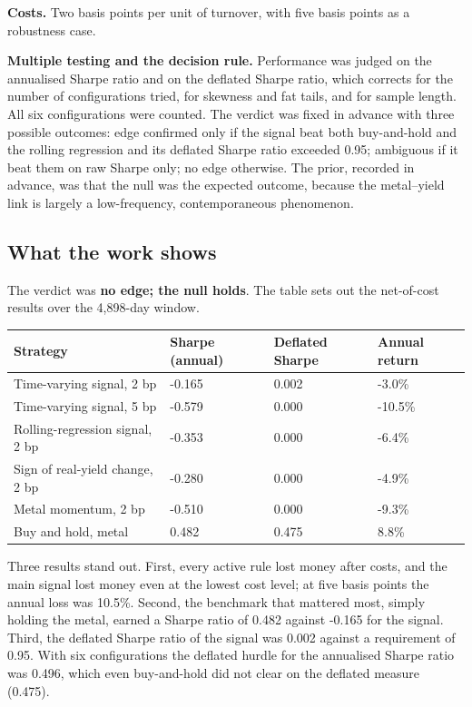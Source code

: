 \documentclass[
  british,
  a4paper,
]{article}
\newcounter{none} %
\begin{document}
\textbf{Costs.} Two basis points per unit of turnover, with five basis
points as a robustness case.

\textbf{Multiple testing and the decision rule.} Performance was judged
on the annualised Sharpe ratio and on the deflated Sharpe ratio, which
corrects for the number of configurations tried, for skewness and fat
tails, and for sample length. All six configurations were counted. The
verdict was fixed in advance with three possible outcomes: edge
confirmed only if the signal beat both buy-and-hold and the rolling
regression and its deflated Sharpe ratio exceeded 0.95; ambiguous if it
beat them on raw Sharpe only; no edge otherwise. The prior, recorded in
advance, was that the null was the expected outcome, because the
metal--yield link is largely a low-frequency, contemporaneous
phenomenon.

\subsection{What the work shows}\label{what-the-work-shows}

The verdict was \textbf{no edge; the null holds}. The table sets out the
net-of-cost results over the 4,898-day window.

{\def\LTcaptype{none} %
\begin{longtable}[]{@{}llll@{}}
\toprule\noalign{}
Strategy & Sharpe (annual) & Deflated Sharpe & Annual return \\
\midrule\noalign{}
\endhead
\bottomrule\noalign{}
\endlastfoot
Time-varying signal, 2 bp & -0.165 & 0.002 & -3.0\% \\
Time-varying signal, 5 bp & -0.579 & 0.000 & -10.5\% \\
Rolling-regression signal, 2 bp & -0.353 & 0.000 & -6.4\% \\
Sign of real-yield change, 2 bp & -0.280 & 0.000 & -4.9\% \\
Metal momentum, 2 bp & -0.510 & 0.000 & -9.3\% \\
Buy and hold, metal & 0.482 & 0.475 & 8.8\% \\
\end{longtable}
}

Three results stand out. First, every active rule lost money after
costs, and the main signal lost money even at the lowest cost level; at
five basis points the annual loss was 10.5\%. Second, the benchmark that
mattered most, simply holding the metal, earned a Sharpe ratio of 0.482
against -0.165 for the signal. Third, the deflated Sharpe ratio of the
signal was 0.002 against a requirement of 0.95. With six configurations
the deflated hurdle for the annualised Sharpe ratio was 0.496, which
even buy-and-hold did not clear on the deflated measure (0.475).
\end{document}
